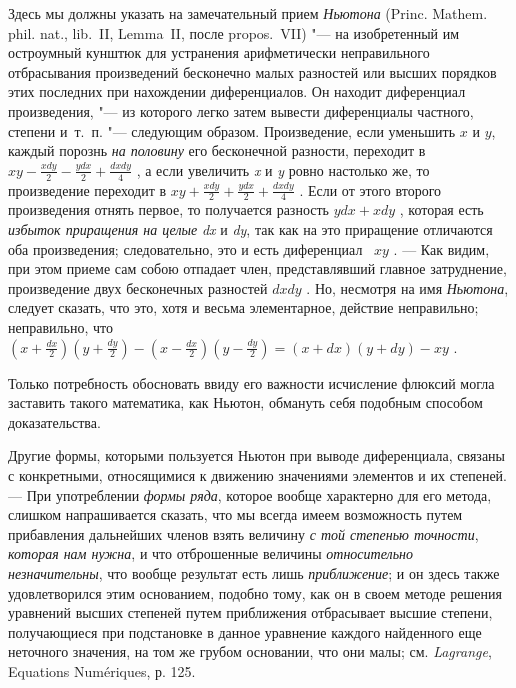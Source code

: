 {Здесь мы должны указать на замечательный прием {\em Ньютона}
(Princ. Mathem. phil. nat., lib.~II, Lemma~II, после propos.~VII)
"--- на изобретенный им остроумный кунштюк для устранения арифметически
неправильного отбрасывания произведений бесконечно малых разностей или
высших порядков этих последних при нахождении диференциалов. Он находит
диференциал произведения, "--- из которого легко затем вывести диференциалы
частного, степени и~т.~п. "--- следующим образом. Произведение, если уменьшить
$x$ и $y$, каждый порознь
{\em на половину} его бесконечной разности, переходит в
 $\mathit{xy}-\frac{\mathit{xdy}} 2-\frac{\mathit{ydx}}
2+\frac{\mathit{dxdy}} 4$ , а если увеличить {\em x} и
{\em y} ровно настолько же, то произведение переходит в
 $\mathit{xy}+\frac{\mathit{xdy}} 2+\frac{\mathit{ydx}}
2+\frac{\mathit{dxdy}} 4$ . Если от этого второго произведения отнять
первое, то получается разность  $\mathit{ydx}+\mathit{xdy}$ , которая есть
{\em избыток приращения на целые}
{\em dx} и {\em dy}, так как на это
приращение отличаются оба произведения; следовательно, это и есть
диференциал \  $\mathit{xy}$ . — Как видим, при этом приеме сам собою
отпадает член, представлявший главное затруднение, произведение двух
бесконечных разностей  $\mathit{dxdy}$ . Но, несмотря на имя
{\em Ньютона}, следует сказать, что это, хотя и весьма
элементарное, действие неправильно; неправильно, что 
$\left(x+\frac{\mathit{dx}} 2\right)\left(y+\frac{\mathit{dy}}
2\right)-\left(x-\frac{\mathit{dx}} 2\right)\left(y-\frac{\mathit{dy}}
2\right)=\left(x+\mathit{dx}\right)\left(y+\mathit{dy}\right)-\mathit{xy}$
.

Только потребность обосновать ввиду его важности исчисление флюксий могла
заставить такого математика, как Ньютон, обмануть себя подобным способом
доказательства.

Другие формы, которыми пользуется Ньютон при выводе диференциала, связаны с
конкретными, относящимися к движению значениями элементов и их степеней. —
При употреблении {\em формы ряда}, которое вообще
характерно для его метода, слишком напрашивается сказать, что мы всегда
имеем возможность путем прибавления дальнейших членов взять величину
{\em с той степенью точности},
{\em которая нам нужна}, и что отброшенные величины
{\em относительно незначительны}, что вообще результат
есть лишь {\em приближение}; и он здесь также
удовлетворился этим основанием, подобно тому, как он в своем методе решения
уравнений высших степеней путем приближения отбрасывает высшие степени,
получающиеся при подстановке в данное уравнение каждого найденного еще
неточного значения, на том же грубом основании, что они малы; см.
{\em Lagrange}, Equations Numériques, р. 125.

}
